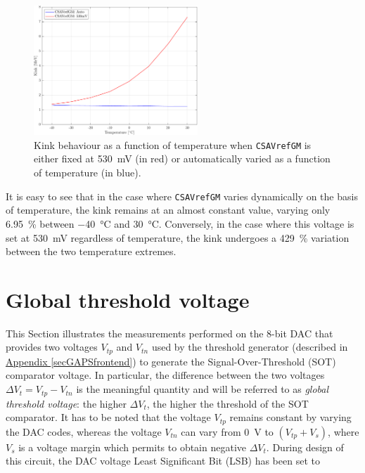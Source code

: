 \begin{figure}[h!]
    \centering
    \includegraphics[width=0.55\textwidth]{Images/chap1/results/FDT/plot_pedestal_gain_auto_530mV.pdf}
    \caption{Kink behaviour as a function of temperature when \texttt{CSAVrefGM} is either fixed at \SI{530}{\milli\volt} (in red) or automatically varied as a function of temperature (in blue).}
    \label{figFDTkinkVariationResult}
\end{figure}

\par
It is easy to see that in the case where \texttt{CSAVrefGM} varies dynamically on the basis of temperature, the kink remains at an almost constant value, varying only \SI{6.95}{\percent} between \SI{-40}{\celsius} and \SI{30}{\celsius}. Conversely, in the case where this voltage is set at \SI{530}{\milli\volt} regardless of temperature, the kink undergoes a \SI{429}{\percent} variation between the two temperature extremes.



\section{Global threshold voltage}
\label{thresholdVoltageANALYSIS}

This Section illustrates the measurements performed on the 8-bit DAC that provides two voltages $V_{\textit{tp}}$ and $V_{\textit{tn}}$ used by the threshold generator (described in \hyperref[secGAPSfrontend]{Appendix \ref{secGAPSfrontend}}) to generate the Signal-Over-Threshold (SOT) comparator voltage. In particular, the difference between the two voltages $\Delta V_{\textit{t}} = V_{\textit{tp}}-V_{\textit{tn}}$ is the meaningful quantity and will be referred to as \textit{global threshold voltage}: the higher $\Delta V_{\textit{t}}$, the higher the threshold of the SOT comparator. It has to be noted that the voltage $V_{\textit{tp}}$ remains constant by varying the DAC codes, whereas the voltage $V_{\textit{tn}}$ can vary from \SI{0}{\volt} to $(V_{\textit{tp}}+V_{\textit{s}})$, where $V_{\textit{s}}$ is a voltage margin which permits to obtain negative $\Delta V_{\textit{t}}$. During design of this circuit, the DAC voltage Least Significant Bit (LSB) has been set to 

